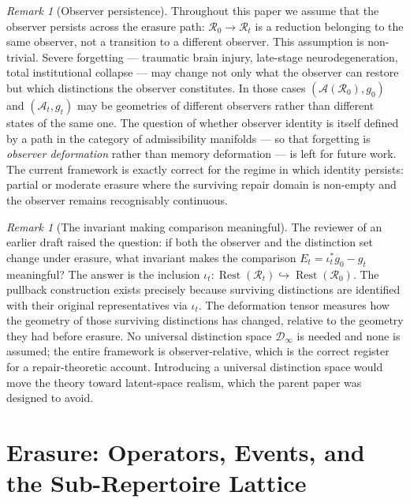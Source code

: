 \documentclass[12pt, oneside]{article}
\theoremstyle{plain}
\theoremstyle{definition}
\theoremstyle{remark}
\newtheorem{remark}[theorem]{Remark}
\DeclareMathOperator{\Rest}{Rest}
\newcommand{\AO}{\mathcal{A}}
\newcommand{\At}{\mathcal{A}_t}
\newcommand{\Rt}{\mathcal{R}_t}
\newcommand{\Rzero}{\mathcal{R}_0}
\newcommand{\Restzt}{\Rest(\Rt)}
\newcommand{\Restzero}{\Rest(\Rzero)}
\newcommand{\iotat}{\iota_t}
\newcommand{\Et}{E_t}
\newcommand{\gt}{g_t}
\newcommand{\gzero}{g_0}
\begin{document}
\begin{remark}[Observer persistence]
  Throughout this paper we assume that the observer persists across
  the erasure path: $\Rzero \to \Rt$ is a reduction belonging to
  the same observer, not a transition to a different observer.
  This assumption is non-trivial.
  Severe forgetting --- traumatic brain injury, late-stage
  neurodegeneration, total institutional collapse --- may change not
  only what the observer can restore but which distinctions the
  observer constitutes.
  In those cases $(\AO(\Rzero), \gzero)$ and $(\At, \gt)$ may be
  geometries of different observers rather than different states of
  the same one.
  The question of whether observer identity is itself defined by a
  path in the category of admissibility manifolds --- so that
  forgetting is \emph{observer deformation} rather than memory
  deformation --- is left for future work.
  The current framework is exactly correct for the regime in which
  identity persists: partial or moderate erasure where the surviving
  repair domain is non-empty and the observer remains recognisably
  continuous.
\end{remark}

\begin{remark}[The invariant making comparison meaningful]
  The reviewer of an earlier draft raised the question: if both the
  observer and the distinction set change under erasure, what
  invariant makes the comparison $\Et = \iotat^* \gzero - \gt$
  meaningful?
  The answer is the inclusion $\iotat : \Restzt \hookrightarrow
  \Restzero$.
  The pullback construction exists precisely because surviving
  distinctions are identified with their original representatives
  via $\iotat$.
  The deformation tensor measures how the geometry of those surviving
  distinctions has changed, relative to the geometry they had before
  erasure.
  No universal distinction space $\mathcal{D}_\infty$ is needed and
  none is assumed; the entire framework is observer-relative, which
  is the correct register for a repair-theoretic account.
  Introducing a universal distinction space would move the theory
  toward latent-space realism, which the parent paper
  \cite{Flyxion2026a} was designed to avoid.
\end{remark}


\section{Erasure: Operators, Events, and the Sub-Repertoire Lattice}
\label{sec:erasure}
\end{document}
